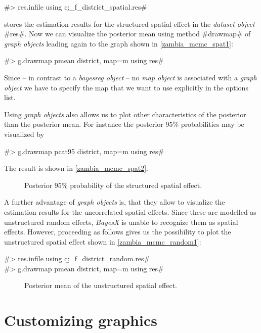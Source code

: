 \documentclass[11pt,a4paper,twoside]{bayesxreport}
\begin{document}
#> res.infile using c:\data\b_f_district_spatial.res#

stores the estimation results for the structured spatial effect in
the {\em dataset object} #res#. Now we can visualize the posterior
mean using method #drawmap# of {\it graph objects} leading again to
the graph shown in \autoref{zambia_mcmc_spat1}:

#> g.drawmap pmean district, map=m using res#

Since -- in contrast to a {\it bayesreg object} -- no {\it map
object} is associated with a {\it graph object} we have to specify
the map that we want to use explicitly in the options list.

Using {\it graph objects} also allows us to plot other
characteristics of the posterior than the posterior mean. For
instance the posterior 95\% probabilities may be visualized by

#> g.drawmap pcat95 district, map=m using res#

The result is shown in \autoref{zambia_mcmc_spat2}.

\begin{figure}[ht]
\begin{center}
{\it\caption{Posterior 95\% probability of the structured spatial
effect.\label{zambia_mcmc_spat2}}}
\end{center}
\end{figure}

A further advantage of {\it graph objects} is, that they allow to
visualize the estimation results for the uncorrelated spatial
effects. Since these are modelled as unstructured random effects,
{\it BayesX} is unable to recognize them as spatial effects.
However, proceeding as follows gives us the possibility to plot the
unstructured spatial effect shown in \autoref{zambia_mcmc_random1}:

#> res.infile using c:\data\b_f_district_random.res#\\
#> g.drawmap pmean district, map=m using res#

\begin{figure}[ht]
\begin{center}
{\it\caption{Posterior mean of the unstructured spatial
effect.\label{zambia_mcmc_random1}}}
\end{center}
\end{figure}

\section{Customizing graphics}\label{zambia_mcmc_custom}
\end{document}
